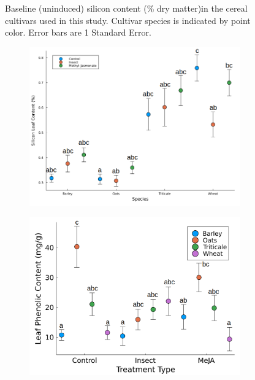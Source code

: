 \documentclass[12pt, letterpaper, ]{report}
\begin{document}
\begin{figure}[h]
        \centering
        \caption{Baseline (uninduced) silicon content (\% dry matter)in the cereal cultivars used in this study. Cultivar species is indicated by point color. Error bars are 1 Standard Error.}
        \label{Fig:baseline_si}
\end{figure}

\begin{figure}[h]
        \centering
        \begin{subfigure}[b]{0.45\textwidth}
                \centering
                \includegraphics[width = \textwidth]{images/induction_plot_letters.png}
        \end{subfigure}
        \hfill
        \begin{subfigure}[b]{0.45\textwidth}
                \centering
                \includegraphics[width = \textwidth]{images/phenolic_induction_plot_letters.png}

\end{subfigure}
\end{figure}
\end{document}
